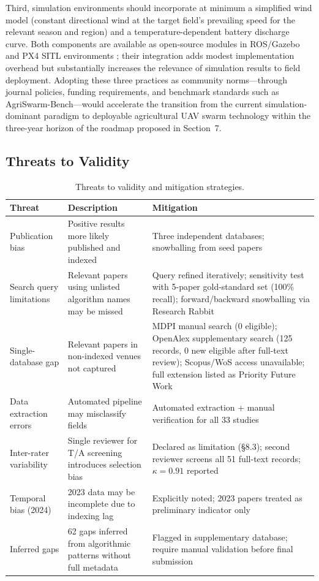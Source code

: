 \documentclass[review,3p,times]{elsarticle}
\begin{document}
\begin{itemize}
{Third, simulation environments should incorporate at minimum a simplified wind model (constant directional wind at the target field's prevailing speed for the relevant season and region) and a temperature-dependent battery discharge curve. Both components are available as open-source modules in ROS/Gazebo and PX4 SITL environments \cite{shafiq2022}; their integration adds modest implementation overhead but substantially increases the relevance of simulation results to field deployment. Adopting these three practices as community norms---through journal policies, funding requirements, and benchmark standards such as AgriSwarm-Bench---would accelerate the transition from the current simulation-dominant paradigm to deployable agricultural UAV swarm technology within the three-year horizon of the roadmap proposed in Section~7.

\subsection{Threats to Validity}
\begin{table}[p]
\centering
\caption{Threats to validity and mitigation strategies.}
\label{tab:threats}
\small
\begin{tabularx}{\textwidth}{p{3cm}XX}
\toprule
\textbf{Threat} & \textbf{Description} & \textbf{Mitigation} \\
\midrule
Publication bias & Positive results more likely published and indexed & Three independent databases; snowballing from seed papers \\[4pt]
Search query limitations & Relevant papers using unlisted algorithm names may be missed & Query refined iteratively; sensitivity test with 5-paper gold-standard set (100\% recall); forward/backward snowballing via Research Rabbit \\[4pt]
Single-database gap & Relevant papers in non-indexed venues not captured & MDPI manual search (0 eligible); OpenAlex supplementary search (125 records, 0 new eligible after full-text review); Scopus/WoS access unavailable; full extension listed as Priority Future Work \\[4pt]
Data extraction errors & Automated pipeline may misclassify fields & Automated extraction + manual verification for all 33 studies \\[4pt]
Inter-rater variability & Single reviewer for T/A screening introduces selection bias & Declared as limitation (§8.3); second reviewer screens all 51 full-text records; $\kappa=0.91$ reported \\[4pt]
Temporal bias (2024) & 2023 data may be incomplete due to indexing lag & Explicitly noted; 2023 papers treated as preliminary indicator only \\[4pt]
Inferred gaps & 62 gaps inferred from algorithmic patterns without full metadata & Flagged in supplementary database; require manual validation before final submission \\
\bottomrule
\end{tabularx}
\end{table}

}
\end{itemize}
\end{document}
